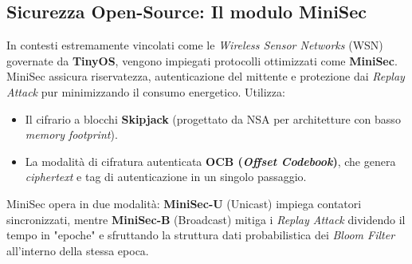 \subsection{Sicurezza Open-Source: Il modulo MiniSec}
In contesti estremamente vincolati come le \textit{Wireless Sensor Networks} (WSN) governate da \textbf{TinyOS}, vengono impiegati protocolli ottimizzati come \textbf{MiniSec}.
MiniSec assicura riservatezza, autenticazione del mittente e protezione dai \textit{Replay Attack} pur minimizzando il consumo energetico. Utilizza:
\begin{itemize}
    \item Il cifrario a blocchi \textbf{Skipjack} (progettato da NSA per architetture con basso \textit{memory footprint}).
    \item La modalità di cifratura autenticata \textbf{OCB (\textit{Offset Codebook})}, che genera \textit{ciphertext} e tag di autenticazione in un singolo passaggio.
\end{itemize}
MiniSec opera in due modalità: \textbf{MiniSec-U} (Unicast) impiega contatori sincronizzati, mentre \textbf{MiniSec-B} (Broadcast) mitiga i \textit{Replay Attack} dividendo il tempo in "epoche" e sfruttando la struttura dati probabilistica dei \textit{Bloom Filter} all'interno della stessa epoca.
